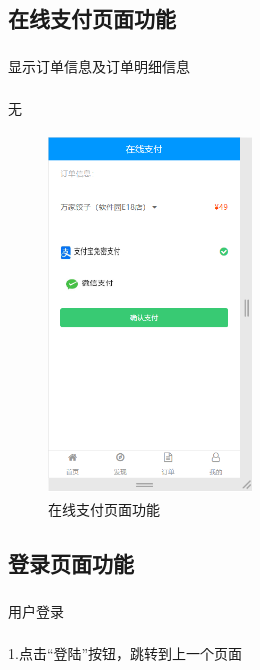 \subsection{在线支付页面功能}
\subsubsection*{}
显示订单信息及订单明细信息
\subsubsection*{}
无
\begin{figure}[H]
    \centering
    \includegraphics[width=5.4cm,height=9.6cm]{figures/2.2.5.png}
    \caption{在线支付页面功能}
\end{figure}

\subsection{登录页面功能}
\subsubsection*{}
用户登录
\subsubsection*{}
1.点击“登陆”按钮，跳转到上一个页面

